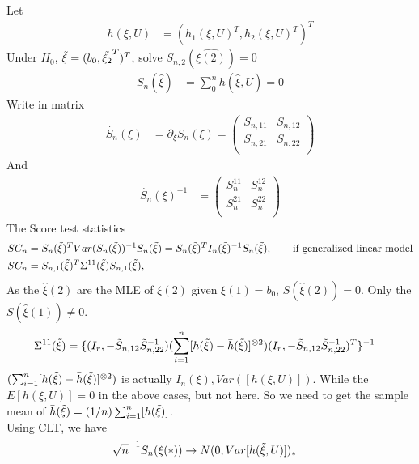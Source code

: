 \documentclass[11pt]{article} %
\begin{document}
	Let 
	\begin{align*}
		h(\xi, U) &= \left( h_1(\xi, U)^T,  h_2(\xi, U)^T\right)^T
	\end{align*}
	Under $H_0$, $\Tilde{\xi} = (b_0, \Tilde{\xi_2}^T)^T$, solve $S_{n,2}(\hat{\xi(2)}) = 0$
	\begin{align*}
		S_n(\hat{\xi}) &= \sum_{0}^n h\left( \hat{\xi}, U\right) = 0
	\end{align*}
	Write in matrix
	\begin{align*}
		\dot{S_n}(\xi) &= \partial_{\xi} S_n(\xi) =  \begin{pmatrix}
			S_{n,11}  & S_{n,12} \\
			S_{n,21} &  S_{n,22}  \\
		\end{pmatrix}
	\end{align*}
	And
	\begin{align*}
		\dot{S_n}(\xi)^{-1} &= \begin{pmatrix}
			S_{n}^{11}  & S_{n}^{12} \\
			S_{n}^{21} &  S_{n}^{22}  \\
		\end{pmatrix}
	\end{align*}
	The Score test statistics
	\begin{align*}
		SC_n &= S_{n}(\Tilde{\xi})^T Var(S_n(\Tilde{\xi}))^{-1} S_{n}(\Tilde{\xi})= S_{n}(\Tilde{\xi})^T I_n(\Tilde{\xi})^{-1} S_{n}(\Tilde{\xi}), \qquad \text{if generalized linear model}\\
		SC_n &= S_{n,1}(\Tilde{\xi})^T \Sigma^{11}(\Tilde{\xi}) S_{n,1}(\Tilde{\xi}) , 
	\end{align*}
	As the $\hat{\xi}(2)$ are the MLE of ${\xi}(2)$ given ${\xi}(1) = b_0$, $S(\hat{\xi}(2)) = 0$. Only the $S(\hat{\xi}(1)) \neq 0$.
	\begin{align*}
		\Sigma^{11}(\Tilde{\xi}) &= \{(I_r, -\Tilde{S}_{n,12}\Tilde{S}^{-1}_{n,22}) (\sum_{i=1}^n [h(\Tilde{\xi}) - \bar{h}(\Tilde{\xi})]^{\otimes 2}) (I_r, -\Tilde{S}_{n,12}\Tilde{S}^{-1}_{n,22})^T\}^{-1}
	\end{align*}
	$(\sum_{i=1}^n [h(\Tilde{\xi}) - \bar{h}(\Tilde{\xi})]^{\otimes 2})$ is actually $I_n(\xi), Var([h(\xi,U)])$. While the $E[h(\xi,U)] = 0$ in the above cases, but not here. So we need to get the sample mean of $\bar{h}(\Tilde{\xi}) = (1/n) \sum_{i=1}^n [h(\Tilde{\xi})]$. \\
	Using CLT, we have 
	\begin{align*}
		\sqrt{n}^{-1} S_n(\xi(\ast))  & \rightarrow N(0, Var[h(\Tilde{\xi}, U)])_{\ast} 
	\end{align*} 
\end{document}
